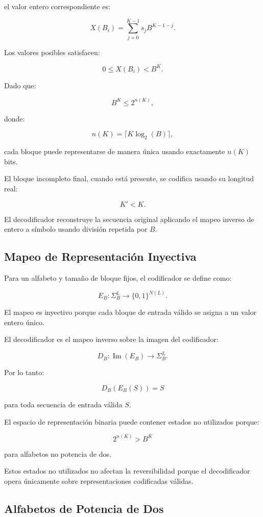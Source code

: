 \documentclass[onecolumn]{IEEEtran}
\begin{document}
el valor entero correspondiente es:

\[
X(B_i)
=
\sum_{j=0}^{K-1}
s_j B^{K-1-j}.
\]

Los valores posibles satisfacen:

\[
0\leq X(B_i)<B^K .
\]

Dado que:

\[
B^K\leq2^{n(K)},
\]

donde:

\[
n(K)=\lceil K\log_2(B)\rceil ,
\]

cada bloque puede representarse de manera única usando exactamente
$n(K)$ bits.

El bloque incompleto final, cuando está presente, se codifica usando
su longitud real:

\[
K'<K .
\]

El decodificador reconstruye la secuencia original aplicando el mapeo
inverso de entero a símbolo usando división repetida por $B$.

\subsection{Mapeo de Representación Inyectiva}

Para un alfabeto y tamaño de bloque fijos, el codificador se define
como:

\[
E_B:
\Sigma_B^L
\rightarrow
\{0,1\}^{N(L)} .
\]

El mapeo es inyectivo porque cada bloque de entrada válido se asigna
a un valor entero único.

El decodificador es el mapeo inverso sobre la imagen del codificador:

\[
D_B:
\operatorname{Im}(E_B)
\rightarrow
\Sigma_B^L .
\]

Por lo tanto:

\[
D_B(E_B(S))=S
\]

para toda secuencia de entrada válida $S$.

El espacio de representación binaria puede contener estados no
utilizados porque:

\[
2^{n(K)}>B^K
\]

para alfabetos no potencia de dos.

Estos estados no utilizados no afectan la reversibilidad porque el
decodificador opera únicamente sobre representaciones codificadas
válidas.

\subsection{Alfabetos de Potencia de Dos}
\end{document}

